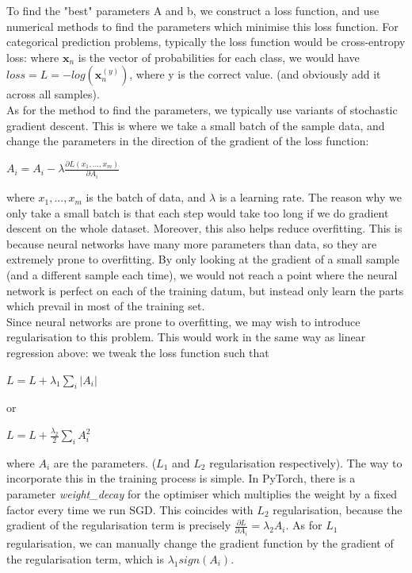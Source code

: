 \documentclass[11pt,a4paper]{article}
\begin{document}
To find the "best" parameters A and b, we construct a loss function, and use numerical methods to find the parameters which minimise this loss function. For categorical prediction problems, typically the loss function would be cross-entropy loss: where $\mathbf{x}_n$ is the vector of probabilities for each class, we would have $loss = L = -log(\mathbf{x}_n^{(y)})$, where y is the correct value. (and obviously add it across all samples). \\

As for the method to find the parameters, we typically use variants of stochastic gradient descent. This is where we take a small batch of the sample data, and change the parameters in the direction of the gradient of the loss function: 
\begin{center} $A_i = A_i - \lambda \frac{\partial L(x_1, ..., x_m)}{\partial A_i}$ \end{center}
where $x_1, ..., x_m$ is the batch of data, and $\lambda$ is a learning rate. The reason why we only take a small batch is that each step would take too long if we do gradient descent on the whole dataset. Moreover, this also helps reduce overfitting. This is because neural networks have many more parameters than data, so they are extremely prone to overfitting. By only looking at the gradient of a small sample (and a different sample each time), we would not reach a point where the neural network is perfect on each of the training datum, but instead only learn the parts which prevail in most of the training set. \\

Since neural networks are prone to overfitting, we may wish to introduce regularisation to this problem. This would work in the same way as linear regression above: we tweak the loss function such that
\begin{center} $L = L + \lambda_1 \sum_i |A_i|$ \end{center}
or 
\begin{center} $L = L + \frac{\lambda_2}{2} \sum_i A_i^2$ \end{center}
where $A_i$ are the parameters. ($L_1$ and $L_2$ regularisation respectively). The way to incorporate this in the training process is simple. In PyTorch, there is a parameter \emph{weight\_decay} for the optimiser which multiplies the weight by a fixed factor every time we run SGD. This coincides with $L_2$ regularisation, because the gradient of the regularisation term is precisely $\frac{\partial L}{\partial A_i} = \lambda_2 A_i$. As for $L_1$ regularisation, we can manually change the gradient function by the gradient of the regularisation term, which is $\lambda_1 sign(A_i)$.
\end{document}
